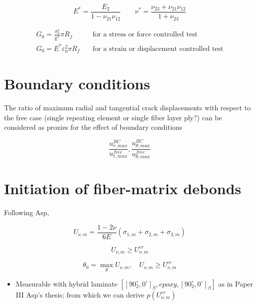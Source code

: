 \documentclass[review]{elsarticle}
\begin{document}
\begin{equation}\label{eq:equiplanestraintransiso}
E^{*}=\frac{E_{2}}{1-\nu_{21}\nu_{12}}\qquad\nu^{*}=\frac{\nu_{23}+\nu_{21}\nu_{12}}{1+\nu_{23}}
\end{equation}

\begin{equation}
\begin{split}
G_{0}=\frac{\sigma_{0}^{2}}{E^{*}}\pi R_{f}\quad&\text{for a stress or force controlled test}\\[5pt]
G_{0}=E^{*}\varepsilon_{0}^{2}\pi R_{f}\quad&\text{for a strain or displacement controlled test}
\end{split}
\end{equation}

\section{Boundary conditions}

The ratio of maximum radial and tangential crack displacements with respect to the free case (single repeating element or single fiber layer ply?) can be considered as proxies for the effect of boundary conditions

\begin{equation}
\frac{u^{BC}_{r,max}}{u^{free}_{r,max}},\frac{u^{BC}_{\theta,max}}{u^{free}_{\theta,max}}
\end{equation}

\section{Initiation of fiber-matrix debonds}

Following Asp,

\begin{equation}
U_{\nu,m}=\frac{1-2\nu}{6E}\left(\sigma_{1,m}+\sigma_{2,m}+\sigma_{3,m}\right)
\end{equation}

\begin{equation}
U_{\nu,m}\geq U_{\nu,m}^{cr}
\end{equation}

\begin{equation}
\theta_{0}=\max_{\theta}{U_{\nu,m}},\quad U_{\nu,m}\geq U_{\nu,m}^{cr}
\end{equation}

\begin{itemize}[$\rightarrow$]
\item Measurable with hybrid laminate $[[90^{\circ}_{2},0^{\circ}]_{S},epoxy,[90^{\circ}_{2},0^{\circ}]_{S}]$ as in Paper III Asp's thesis; from which we can derive $p\left(U_{\nu,m}^{cr}\right)$
\end{itemize}
\end{document}
